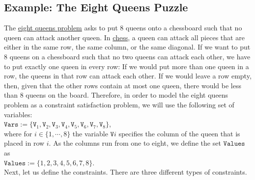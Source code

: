 \subsection{Example: The Eight Queens Puzzle}
The \href{https://en.wikipedia.org/wiki/Eight_queens_puzzle}{eight queens problem} asks to put 8 queens onto a
chessboard such that no queen can attack another queen.  In \href{https://en.wikipedia.org/wiki/Chess}{chess},
a queen can attack all pieces that are either in the same row, the same column, or the same diagonal.  If we
want to put 8 queens on a chessboard such that no two queens can attack each other, we have to put exactly one
queen in every row:  If we would put more than one queen in a row, the queens in that row can attack each other.
If we would leave a row empty, then, given that the other rows contain at most one queen, there would be less
than 8 queens on the board.  Therefore, in order to model the eight queens problem as a constraint satisfaction
problem, we will use the following set of variables:
\\[0.2cm]
\hspace*{1.3cm}
$\mathtt{Vars} := \{ \mathtt{V}_1, \mathtt{V}_2, \mathtt{V}_3, \mathtt{V}_4, \mathtt{V}_5, \mathtt{V}_6, \mathtt{V}_7,\mathtt{V}_8 \}$,
\\[0.2cm]
where for $i \in \{1,\cdots,8\}$ the variable $\mathtt{V}i$ specifies the column of the queen that is placed in
row $i$.   As the columns run from one to eight, we define the set $\mathtt{Values}$ as
\\[0.2cm]
\hspace*{1.3cm}
$\mathtt{Values} := \{1,2,3,4,5,6,7,8\}$.
\\[0.2cm]
Next, let us define the constraints.  There are three different types of constraints.
